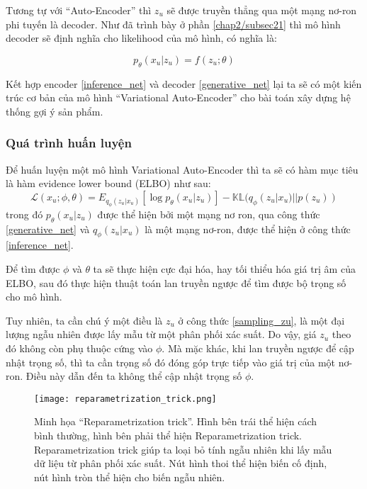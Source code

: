     

    Tương tự với ``Auto-Encoder'' thì $z_u$ sẽ được truyền thẳng qua một mạng nơ-ron phi tuyến là decoder. 
    Như đã trình bày ở phần \ref{chap2/subsec21} thì mô hình decoder sẽ định nghĩa cho likelihood của mô hình, có nghĩa là:

    \begin{equation}
        \label{generative_net}
        p_\theta(x_u|z_u) = f(z_u;\theta)
    \end{equation}

    Kết hợp encoder \ref{inference_net} và decoder \ref{generative_net} lại ta sẽ có một kiến trúc cơ bản của mô hình ``Variational Auto-Encoder'' cho bài toán xây dựng hệ thống gợi ý sản phẩm.

    \subsubsection{Quá trình huấn luyện}
    Để huấn luyện một mô hình Variational Auto-Encoder thì ta sẽ có hàm mục tiêu là hàm evidence lower bound (ELBO) như sau:
    \begin{equation}
        \label{elbo_mvae}
        \mathcal{L}(x_u;\phi,\theta) = E_{q_\phi(z_u|x_u)}[\log p_\theta(x_u|z_u)] - \mathbb{KL}(q_\phi(z_u|x_u) || p(z_u))
    \end{equation}
    trong đó $p_\theta(x_u|z_u)$ được thể hiện bởi một mạng nơ ron, qua công thức \ref{generative_net} và $q_\phi(z_u|x_u)$ là một mạng nơ-ron, được thể hiện ở công thức \ref{inference_net}.

    Để tìm được $\phi$ và $\theta$ ta sẽ thực hiện cực đại hóa, hay tối thiểu hóa giá trị âm của ELBO, sau đó thực hiện thuật toán lan truyền ngược để tìm được bộ trọng số cho mô hình. 
    
    Tuy nhiên, ta cần chú ý một điều là $z_u$ ở công thức \ref{sampling_zu}, là một đại lượng ngẫu nhiên được lấy mẫu từ một phân phối xác suất.
    Do vậy, giá $z_u$ theo đó không còn phụ thuộc cứng vào $\phi$.
    Mà mặc khác, khi lan truyền ngược để cập nhật trọng số, thì ta cần trọng số đó đóng góp trực tiếp vào giá trị của một nơ-ron.
    Điều này dẫn đến ta không thể cập nhật trọng số $\phi$. 
    \begin{figure}
        \centering
        \texttt{[image: reparametrization\_trick.png]}
        \caption[Minh họa ``Reparametrization trick'']{Minh họa ``Reparametrization trick''. Hình bên trái thể hiện cách bình thường, hình bên phải thể hiện Reparametrization trick. Reparametrization trick giúp ta loại bỏ tính ngẫu nhiên khi lấy mẫu dữ liệu từ phân phối xác suất. Nút hình thoi thể hiện biến cố định, nút hình tròn thể hiện cho biến ngẫu nhiên.}
        \label{fig_repatrick}
    \end{figure}

